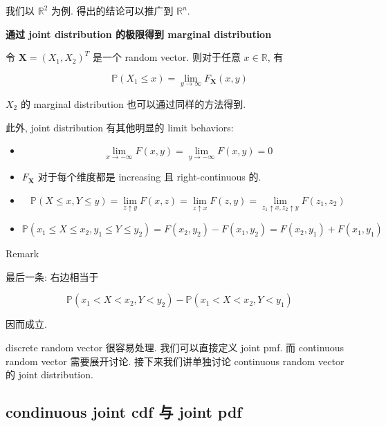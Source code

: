 \documentclass{qlnotes-export}
\begin{document}
我们以 \({\mathbb{R}}^{2}\) 为例. 得出的结论可以推广到 \({\mathbb{R}}^{n}\).

\begin{proposition}{\protect{}\label{kn-marginal-distribution-from-joint-limits}{\textbf{通过
joint distribution 的极限得到 marginal distribution}}}

令 \(\mathbf{X} = (X_{1},X_{2})^{T}\) 是一个 random vector. 则对于任意 \(x \in {\mathbb{R}}\), 有

\[{\mathbb{P}}(X_{1} \leq x) = \lim\limits_{y\rightarrow\infty}F_{\mathbf{X}}(x,y)\]

\(X_{2}\) 的 marginal distribution 也可以通过同样的方法得到.

此外, joint distribution 有其他明显的 limit behaviors:

\begin{itemize}
\item
  \[\lim\limits_{x\rightarrow - \infty}F(x,y) = \lim\limits_{y\rightarrow - \infty}F(x,y) = 0\]
\item
  \(F_{\mathbf{X}}\) 对于每个维度都是 increasing 且 right-continuous 的.
\item
  \[{\mathbb{P}}(X \leq x,Y \leq y) = \lim\limits_{z \uparrow y}F(x,z) = \lim\limits_{z \uparrow x}F(z,y) = \lim\limits_{z_{1} \uparrow x,z_{2} \uparrow y}F(z_{1},z_{2})\]
\item
  \[{\mathbb{P}}(x_{1} \leq X \leq x_{2},y_{1} \leq Y \leq y_{2}) = F(x_{2},y_{2}) - F(x_{1},y_{2}) = F(x_{2},y_{1}) + F(x_{1},y_{1})\]
\end{itemize}

\end{proposition}

\begin{qlremark}{Remark}

最后一条: 右边相当于

\[{\mathbb{P}}(x_{1} < X < x_{2},Y < y_{2}) - {\mathbb{P}}(x_{1} < X < x_{2},Y < y_{1})\]

因而成立.

\end{qlremark}

discrete random vector 很容易处理. 我们可以直接定义 joint pmf. 而 continuous random vector 需要展开讨论. 接下来我们讲单独讨论 continuous random vector 的 joint distribution.

\subsection{condinuous joint cdf 与 joint pdf}\label{condinuous-joint-cdf-ux4e0e-joint-pdf}
\end{document}
